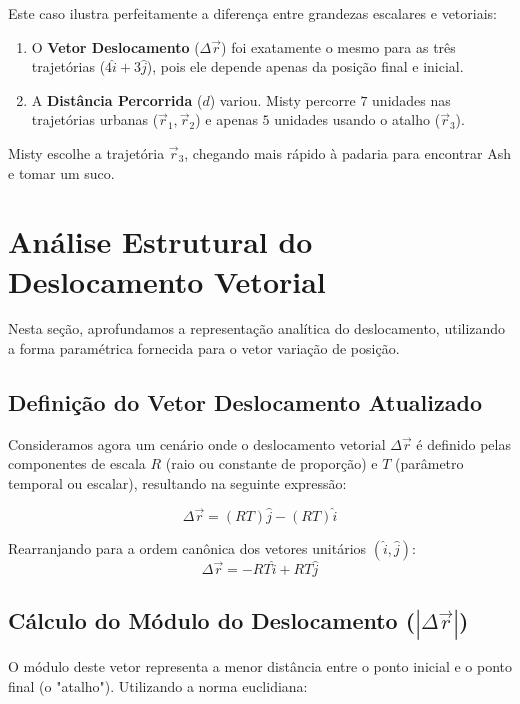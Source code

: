 \documentclass[11pt,a4paper]{article}
\begin{document}
Este caso ilustra perfeitamente a diferença entre grandezas escalares e vetoriais:
\begin{enumerate}
    \item O \textbf{Vetor Deslocamento} ($\Delta \vec{r}$) foi exatamente o mesmo para as três trajetórias ($4\hat{i} + 3\hat{j}$), pois ele depende apenas da posição final e inicial.
    \item A \textbf{Distância Percorrida} ($d$) variou. Misty percorre $7$ unidades nas trajetórias urbanas ($\vec{r}_1, \vec{r}_2$) e apenas $5$ unidades usando o atalho ($\vec{r}_3$).
\end{enumerate}




\begin{center}
Misty escolhe a trajetória $\vec{r}_3$, chegando mais rápido à padaria para encontrar Ash e tomar um suco.
\end{center}


\section{Análise Estrutural do Deslocamento Vetorial}

Nesta seção, aprofundamos a representação analítica do deslocamento, utilizando a forma paramétrica fornecida para o vetor variação de posição.

\subsection{Definição do Vetor Deslocamento Atualizado}
Consideramos agora um cenário onde o deslocamento vetorial $\Delta \vec{r}$ é definido pelas componentes de escala $R$ (raio ou constante de proporção) e $T$ (parâmetro temporal ou escalar), resultando na seguinte expressão:

\begin{equation}
\Delta \vec{r} = (R T) \hat{j} - (R T) \hat{i}
\end{equation}

Rearranjando para a ordem canônica dos vetores unitários $(\hat{i}, \hat{j})$:
\begin{equation}
\Delta \vec{r} = -R T \hat{i} + R T \hat{j}
\end{equation}

\subsection{Cálculo do Módulo do Deslocamento ($|\Delta \vec{r}|$)}
O módulo deste vetor representa a menor distância entre o ponto inicial e o ponto final (o "atalho"). Utilizando a norma euclidiana:
\end{document}
